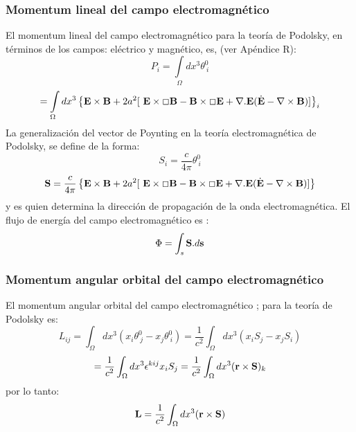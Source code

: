 \documentclass[a4paper,12pt]{article}
\begin{document}
\subsubsection{Momentum lineal del campo electromagnético}
El momentum lineal del campo electromagnético para la teoría de Podolsky, en términos de los campos: eléctrico y magnético, es, (ver Apéndice R):
\begin{equation}
P_i=\int\limits_{\Omega}dx^{3}\theta^{0}_{\ i} 
\label{lineal}
\end{equation}
$$=\int\limits_{\Omega}dx^{3}\left\{{\bf E}\times{\bf B}+2a^2[\ {\bf E}\times\Box{\bf B}-{\bf B}\times\Box{\bf E}+\nabla.{\bf E}(\dot{\bf E}-\nabla\times{\bf B})]\right\}_i
$$
La generalización del vector de Poynting en la teoría electromagnética de Podolsky, se define de la forma:
\begin{equation}
S_i=\frac{c}{4\pi}\theta^{0}_{\ i} 
\label{poin}
\end{equation}
$${\bf S}=\frac{c}{4\pi}\left\{{\bf E}\times{\bf B}+2a^2[\ {\bf E}\times\Box{\bf B}-{\bf B}\times\Box{\bf E}+\nabla.{\bf E}(\dot{\bf E}-\nabla\times{\bf B})]\right\}$$ 
y es quien determina la dirección de propagación de la onda electromagnética. El flujo de energía del campo electromagnético es \cite{fin2,elec}:
\begin{equation}
\Phi=\int_{s}{\bf S}.d{\bf s}
\end{equation}
\subsubsection{Momentum angular orbital del campo electromagnético}
El momentum angular orbital del campo electromagnético \cite{greiner,elec}; para la teoría de Podolsky es:
\begin{equation}
L_{ij}=\int_\Omega dx^3 (x_i\theta_{\ j}^0 -x_j \theta_{\ i}^0)=\frac{1}{c^2}\int_\Omega dx^3(x_iS_j-x_jS_i)
\end{equation}
$$=\frac{1}{c^2}\int_\Omega dx^3\epsilon^{kij}x_iS_j=\frac{1}{c^2}\int_\Omega dx^3({\bf r}\times{\bf S})_k$$
por lo tanto:
\begin{equation}
{\bf L}= \frac{1}{c^2}\int_\Omega dx^3({\bf r}\times{\bf S})
\label{angularor}
\end{equation}
\end{document}
